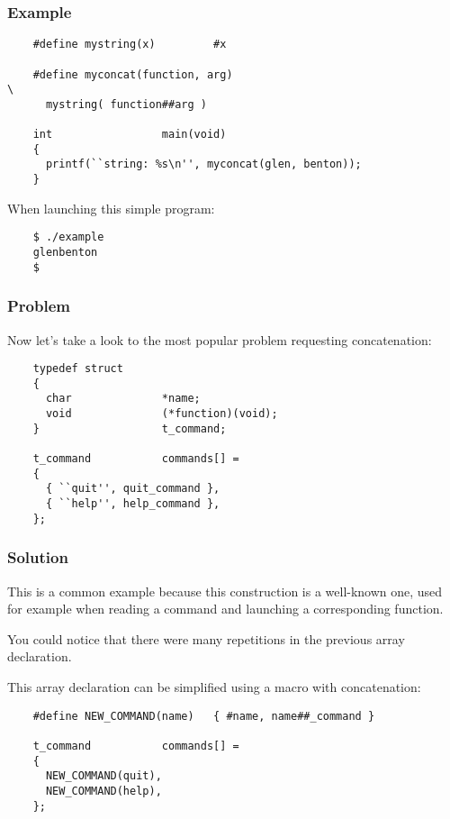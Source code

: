 \documentclass[9pt]{beamer}
\newcommand{\nl}[0]{\vspace{0.4cm}}
\begin{document}

\begin{frame}[containsverbatim]
  \frametitle{Example}

  \begin{verbatim}
    #define mystring(x)         #x

    #define myconcat(function, arg)                                     \
      mystring( function##arg )

    int                 main(void)
    {
      printf(``string: %s\n'', myconcat(glen, benton));
    }
  \end{verbatim}

  When launching this simple program:

  \begin{verbatim}
    $ ./example
    glenbenton
    $ 
  \end{verbatim}
\end{frame}


\begin{frame}[containsverbatim]
  \frametitle{Problem}

  Now let's take a look to the most popular problem requesting concatenation:

  \begin{verbatim}
    typedef struct
    {
      char              *name;
      void              (*function)(void);
    }                   t_command;

    t_command           commands[] =
    {
      { ``quit'', quit_command },
      { ``help'', help_command },
    };
  \end{verbatim}
\end{frame}


\begin{frame}[containsverbatim]
  \frametitle{Solution}

  This is a common example because this construction is a well-known one,
  used for example when reading a command and launching a corresponding
  function.

  \nl

  You could notice that there were many repetitions in the previous
  array declaration.

  \nl

  This array declaration can be simplified using a macro with concatenation:

  \begin{verbatim}
    #define NEW_COMMAND(name)   { #name, name##_command }

    t_command           commands[] =
    {
      NEW_COMMAND(quit),
      NEW_COMMAND(help),
    };
  \end{verbatim}
\end{frame}
\end{document}
